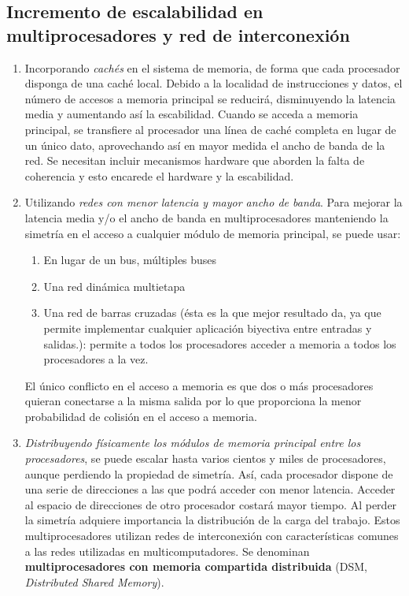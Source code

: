 \documentclass[10pt,a4paper,spanish]{report}
\begin{document}
\textcolor[rgb]{0.2,0.4,0.8}{\subsection{Incremento de escalabilidad en multiprocesadores y red de interconexión}}
\begin{enumerate}[\color{azul}{\bf $\heartsuit$}]
\item Incorporando \textit{\textcolor[rgb]{0.2,0.4,0.8}{cachés}} en el sistema de memoria, de forma que cada procesador disponga de una caché local. Debido a la localidad de instrucciones y datos, el número de accesos a memoria principal se reducirá, disminuyendo la latencia media y aumentando así la escabilidad. Cuando se acceda a memoria principal, se transfiere al procesador una línea de caché completa en lugar de un único dato, aprovechando así en mayor medida el ancho de banda de la red. Se necesitan incluir mecanismos hardware que aborden la falta de coherencia y esto encarede el hardware y la escabilidad.
\item Utilizando \textit{\textcolor[rgb]{0.2,0.4,0.8}{redes con menor latencia y mayor ancho de banda}}. Para mejorar la latencia media y/o el ancho de banda en multiprocesadores manteniendo la simetría en el acceso a cualquier módulo de memoria principal, se puede usar:
\begin{enumerate}[$\longrightarrow$]
\item En lugar de un bus, múltiples buses
\item Una red dinámica multietapa
\item Una red de barras cruzadas (ésta es la que mejor resultado da, ya que permite implementar cualquier aplicación biyectiva entre entradas y salidas.): permite a todos los procesadores acceder a memoria a todos los procesadores a la vez.
\end{enumerate}
El único conflicto en el acceso a memoria es que dos o más procesadores quieran conectarse a la misma salida por lo que proporciona la menor probabilidad de colisión en el acceso a memoria.
\item \textcolor[rgb]{0.2,0.4,0.8}{\textit{Distribuyendo físicamente los módulos de memoria principal entre los procesadores}}, se puede escalar hasta varios cientos y miles de procesadores, aunque perdiendo la propiedad de simetría. Así, cada procesador dispone de una serie de direcciones a las que podrá acceder con menor latencia. Acceder al espacio de direcciones de otro procesador costará mayor tiempo. Al perder la simetría adquiere importancia la distribución de la carga del trabajo. Estos multiprocesadores utilizan redes de interconexión con características comunes a las redes utilizadas en multicomputadores. Se denominan \textbf{\textcolor[rgb]{0.2,0.4,0.8}{multiprocesadores con memoria compartida distribuida}} (DSM, \textit{\textcolor[rgb]{0.2,0.4,0.8}{Distributed Shared Memory}}).
\end{enumerate}
\end{document}
